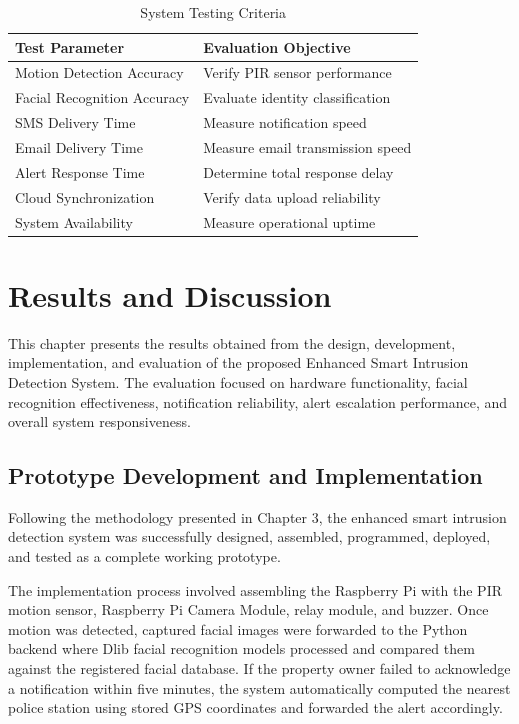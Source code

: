 \documentclass[12pt,a4paper,oneside]{report}
\begin{document}
\begin{table}[htbp]
  \centering
  \caption{System Testing Criteria}
  {\small
  \begin{tabular}{|p{6.00cm}|p{8.00cm}|}
    \hline
    \textbf{Test Parameter} & \textbf{Evaluation Objective} \\
    \hline
    Motion Detection Accuracy  & Verify PIR sensor performance \\
    Facial Recognition Accuracy & Evaluate identity classification \\
    SMS Delivery Time          & Measure notification speed \\
    Email Delivery Time        & Measure email transmission speed \\
    Alert Response Time        & Determine total response delay \\
    Cloud Synchronization      & Verify data upload reliability \\
    System Availability        & Measure operational uptime \\
    \hline
  \end{tabular}
  }
\end{table}

\chapter{Results and Discussion}

This chapter presents the results obtained from the design, development, implementation, and evaluation of the proposed Enhanced Smart Intrusion Detection System. The evaluation focused on hardware functionality, facial recognition effectiveness, notification reliability, alert escalation performance, and overall system responsiveness.

\section{Prototype Development and Implementation}

Following the methodology presented in Chapter 3, the enhanced smart intrusion detection system was successfully designed, assembled, programmed, deployed, and tested as a complete working prototype.

The implementation process involved assembling the Raspberry Pi with the PIR motion sensor, Raspberry Pi Camera Module, relay module, and buzzer. Once motion was detected, captured facial images were forwarded to the Python backend where Dlib facial recognition models processed and compared them against the registered facial database. If the property owner failed to acknowledge a notification within five minutes, the system automatically computed the nearest police station using stored GPS coordinates and forwarded the alert accordingly.
\end{document}
